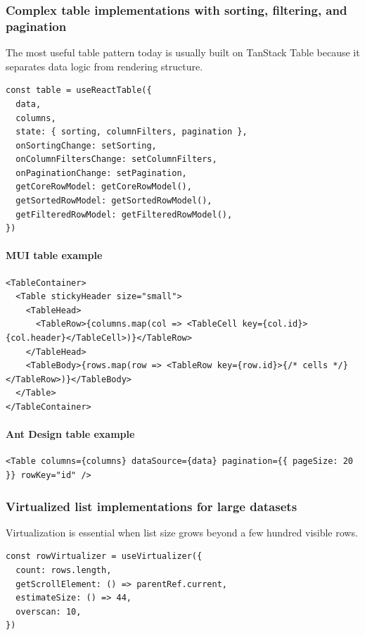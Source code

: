 \subsubsection{Complex table implementations with sorting, filtering, and pagination}
The most useful table pattern today is usually built on TanStack Table because it separates data logic from rendering structure.

\begin{verbatim}
const table = useReactTable({
  data,
  columns,
  state: { sorting, columnFilters, pagination },
  onSortingChange: setSorting,
  onColumnFiltersChange: setColumnFilters,
  onPaginationChange: setPagination,
  getCoreRowModel: getCoreRowModel(),
  getSortedRowModel: getSortedRowModel(),
  getFilteredRowModel: getFilteredRowModel(),
})
\end{verbatim}

\paragraph{MUI table example}
\begin{verbatim}
<TableContainer>
  <Table stickyHeader size="small">
    <TableHead>
      <TableRow>{columns.map(col => <TableCell key={col.id}>{col.header}</TableCell>)}</TableRow>
    </TableHead>
    <TableBody>{rows.map(row => <TableRow key={row.id}>{/* cells */}</TableRow>)}</TableBody>
  </Table>
</TableContainer>
\end{verbatim}

\paragraph{Ant Design table example}
\begin{verbatim}
<Table columns={columns} dataSource={data} pagination={{ pageSize: 20 }} rowKey="id" />
\end{verbatim}

\subsubsection{Virtualized list implementations for large datasets}
Virtualization is essential when list size grows beyond a few hundred visible rows.

\begin{verbatim}
const rowVirtualizer = useVirtualizer({
  count: rows.length,
  getScrollElement: () => parentRef.current,
  estimateSize: () => 44,
  overscan: 10,
})
\end{verbatim}

